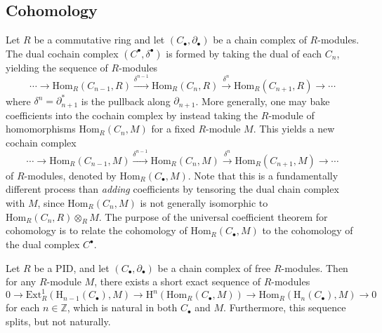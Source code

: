 \subsection{Cohomology}

Let $R$ be a commutative ring and let $(C_\bullet, \partial_\bullet)$ be a chain complex of $R$-modules. The dual cochain complex $(C^\bullet, \delta^\bullet)$ is formed by taking the dual of each $C_n$, yielding the sequence of $R$-modules
\begin{equation*}
    \cdots \to \mathrm{Hom}_R(C_{n-1}, R) \xrightarrow{\delta^{n-1}} \mathrm{Hom}_R(C_n, R) \xrightarrow{\delta^n} \mathrm{Hom}_R(C_{n+1}, R) \to \cdots
\end{equation*}
where $\delta^n = \partial_{n+1}^*$ is the pullback along $\partial_{n+1}$. More generally, one may bake coefficients into the cochain complex by instead taking the $R$-module of homomorphisms $\mathrm{Hom}_R(C_n, M)$ for a fixed $R$-module $M$. This yields a new cochain complex
\begin{equation*}
    \cdots \to \mathrm{Hom}_R(C_{n-1}, M) \xrightarrow{\delta^{n-1}} \mathrm{Hom}_R(C_n, M) \xrightarrow{\delta^n} \mathrm{Hom}_R(C_{n+1}, M) \to \cdots
\end{equation*}
of $R$-modules, denoted by $\mathrm{Hom}_R(C_\bullet, M)$. Note that this is a fundamentally different process than \emph{adding} coefficients by tensoring the dual chain complex with $M$, since $\mathrm{Hom}_R(C_n, M)$ is not generally isomorphic to $\mathrm{Hom}_R(C_n, R) \otimes_R M$. The purpose of the universal coefficient theorem for cohomology is to relate the cohomology of $\mathrm{Hom}_R(C_\bullet, M)$ to the cohomology of the dual complex $C^\bullet$.

\begin{theorem}
    Let $R$ be a PID, and let $(C_\bullet, \partial_\bullet)$ be a chain complex of free $R$-modules. Then for any $R$-module $M$, there exists a short exact sequence of $R$-modules 
    \begin{equation*}
        0 \to \mathrm{Ext}_R^1(\mathrm{H}_{n-1}(C_\bullet), M) \to \mathrm{H}^n(\mathrm{Hom}_R(C_\bullet, M)) \to \mathrm{Hom}_R(\mathrm{H}_n(C_\bullet), M) \to 0
    \end{equation*}
    for each $n \in \mathbb{Z}$, which is natural in both $C_\bullet$ and $M$. Furthermore, this sequence splits, but not naturally.
\end{theorem}